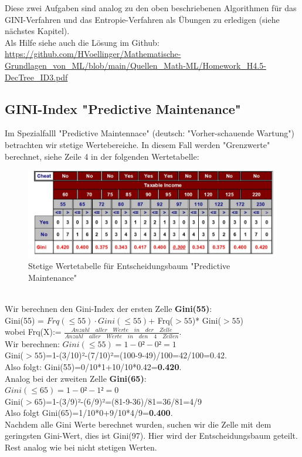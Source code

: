 \documentclass[12pt]{article}
\begin{document}
%
Diese zwei Aufgaben sind analog zu den oben beschriebenen Algorithmen für das GINI-Verfahren und das Entropie-Verfahren als Übungen zu erledigen (siehe nächstes Kapitel).\\[0.2cm]
%
Als Hilfe siehe auch die Lösung im Github:\\ 
\url{https://github.com/HVoellinger/Mathematische-Grundlagen_von_ML/blob/main/Quellen_Math-ML/Homework_H4.5-DecTree_ID3.pdf}
%
\subsection{GINI-Index "Predictive Maintenance"}
Im Spezialfalll "Predictive Maintennace" (deutsch: "Vorher-schauende Wartung") betrachten wir stetige Wertebereiche. In diesem Fall werden "Grenzwerte" berechnet, siehe Zeile 4 in der folgenden Wertetabelle:\\[0.4cm]
\begin{figure}[htp]
  \centering
  \hspace*{-0.9cm} 
  \includegraphics[width=1.20\textwidth]{stetige Wertematrix}
  \caption{Stetige Wertetabelle für Entscheidungsbaum "Predictive Maintenance"}     
  \label{fig:Steige-Wertetabelle}
\end{figure}
\\[0.4cm]   
%
Wir berechnen den Gini-Index der ersten Zelle \textbf{Gini(55)}:\\[0.2cm]
%
Gini(55) = $Frq(\leq 55)\cdot Gini(\leq 55)$+ Frq($ > 55$)* Gini($ > 55$)\\
%
wobei Frq(X):= $\frac{Anzahl \quad aller \quad Werte \quad in \quad der \quad  Zelle}{Anzahl \quad aller \quad Werte \quad in \quad den \quad 4 \quad Zellen}$.\\[0.2cm]
Wir berechnen:  $Gini(\leq 55)=1-0²-0²=1$ \\
Gini($ > 55$)=1-(3/10)²-(7/10)²=(100-9-49)/100=42/100=0.42.\\
Also folgt: Gini(55)=0/10*1+10/10*0.42=\textbf{0.420}.\\[0.3cm]
Analog bei der zweiten Zelle \textbf{Gini(65)}: \\
$Gini(\le 65)=1-0²-1²=0$\\
Gini($ > 65$)=1-(3/9)²-(6/9)²=(81-9-36)/81=36/81=4/9\\
Also folgt Gini(65)=1/10*0+9/10*4/9=\textbf{0.400}.\\[0.3cm]
Nachdem alle Gini Werte berechnet wurden, suchen wir die Zelle mit dem geringsten Gini-Wert, dies ist Gini(97). Hier wird der Entscheidungsbaum geteilt. \\
Rest analog wie bei nicht stetigen Werten.\\[0.2cm]
\end{document}
